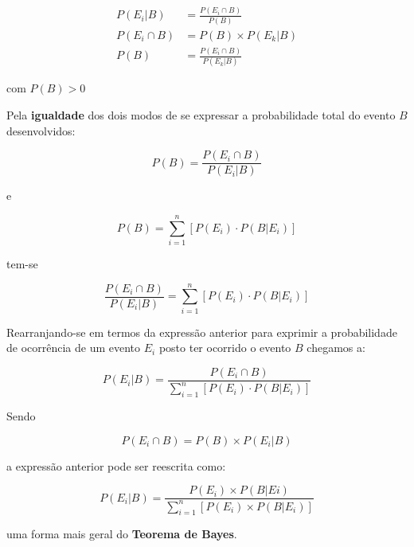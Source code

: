 \documentclass[
]{book}
\begin{document}
\hfill\break

\begin{align*}
P(E_{i}|B) & = \frac{P(E_{i} \cap B)}{P(B)} \\
P(E_{i} \cap B) & = P(B) \times P(E_{k}|B) \\
P(B) & = \frac{P(E_{i}\cap B)}{P(E_{k}|B)}
\end{align*}

\hfill\break

com \(P(B) > 0\)

\hfill\break

Pela \textbf{igualdade} dos dois modos de se expressar a probabilidade total do evento \(B\) desenvolvidos:

\hfill\break

\[
P(B) = \frac{P(E_{i}\cap B)}{P(E_{i}|B)}
\]

\hfill\break

e

\hfill\break

\[
P(B) = \sum _{i=1}^{n}\left[P\left({E}_{i}\right)\cdot P\left(B|{E}_{i}\right)\right]
\]

\hfill\break

tem-se

\hfill\break

\[
\frac{P(E_{i}\cap B)}{P(E_{i}|B)}=\sum _{i=1}^{n}\left[P\left({E}_{i}\right)\cdot P\left(B|{E}_{i}\right)\right]
\]

\hfill\break

Rearranjando-se em termos da expressão anterior para exprimir a probabilidade de ocorrência de um evento \(E_{i}\) posto ter ocorrido o evento \(B\) chegamos a:

\hfill\break

\[
P(E_{i}|B) = \frac{P(E_{i}\cap B)}{\sum _{i=1}^{n}\left[P\left({E}_{i}\right)\cdot P\left(B|{E}_{i}\right)\right]}
\]

\hfill\break

Sendo

\hfill\break

\[
P(E_{i} \cap B) = P(B) \times P(E_{i}|B) 
\]

\hfill\break

a expressão anterior pode ser reescrita como:

\hfill\break

\[
P(E_{i}|B) = \frac{ P(E_{i}) \times P(B|E{i})   }{  \sum _{i=1}^{n}\left[P\left({E}_{i}\right)\times P\left(B|{E}_{i}\right)\right]  }
\]

uma forma mais geral do \textbf{Teorema de Bayes}.
\end{document}
